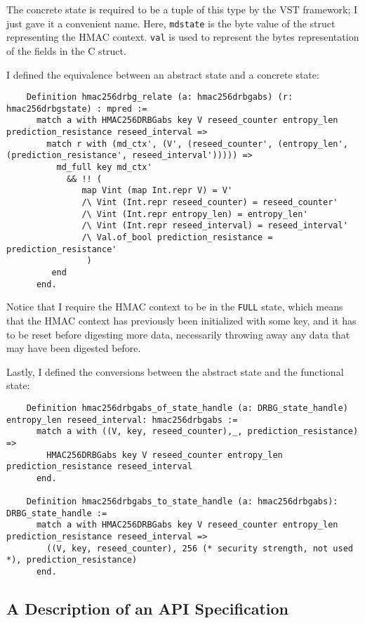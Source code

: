 \documentclass[pageno]{jpaper}
\begin{document}
The concrete state is required to be a tuple of this type by the VST framework; I just gave it a convenient name. Here, \lstinline{mdstate} is the byte value of the struct representing the HMAC context. \lstinline{val} is used to represent the bytes representation of the fields in the C struct.

I defined the equivalence between an abstract state and a concrete state:

\begin{lstlisting}
    Definition hmac256drbg_relate (a: hmac256drbgabs) (r: hmac256drbgstate) : mpred :=
      match a with HMAC256DRBGabs key V reseed_counter entropy_len prediction_resistance reseed_interval =>
        match r with (md_ctx', (V', (reseed_counter', (entropy_len', (prediction_resistance', reseed_interval'))))) =>
          md_full key md_ctx'
            && !! (
               map Vint (map Int.repr V) = V'
               /\ Vint (Int.repr reseed_counter) = reseed_counter'
               /\ Vint (Int.repr entropy_len) = entropy_len'
               /\ Vint (Int.repr reseed_interval) = reseed_interval'
               /\ Val.of_bool prediction_resistance = prediction_resistance'
                )
         end
      end.
\end{lstlisting}

Notice that I require the HMAC context to be in the \lstinline{FULL} state, which means that the HMAC context has previously been initialized with some key, and it has to be reset before digesting more data, necessarily throwing away any data that may have been digested before.

Lastly, I defined the conversions between the abstract state and the functional state:

\begin{lstlisting}
    Definition hmac256drbgabs_of_state_handle (a: DRBG_state_handle) entropy_len reseed_interval: hmac256drbgabs :=
      match a with ((V, key, reseed_counter),_, prediction_resistance) =>
        HMAC256DRBGabs key V reseed_counter entropy_len prediction_resistance reseed_interval
      end.

    Definition hmac256drbgabs_to_state_handle (a: hmac256drbgabs): DRBG_state_handle :=
      match a with HMAC256DRBGabs key V reseed_counter entropy_len prediction_resistance reseed_interval =>
        ((V, key, reseed_counter), 256 (* security strength, not used *), prediction_resistance)
      end.
\end{lstlisting}

\subsection{A Description of an API Specification}
\end{document}
